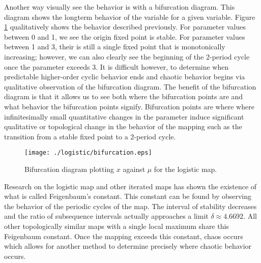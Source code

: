 Another way visually see the behavior is with a bifurcation diagram. This diagram shows the longterm behavior of the variable for a given variable. Figure \ref{log_bifurcation} qualitatively shows the behavior described previously. For parameter values between 0 and 1, we see the origin fixed point is stable. For parameter values between 1 and 3, their is still a single fixed point that is monotonically increasing; however, we can also clearly see the beginning of the 2-period cycle once the parameter exceeds 3. It is difficult however, to determine when predictable higher-order cyclic behavior ends and chaotic behavior begins via qualitative observation of the bifurcation diagram. The benefit of the bifurcation diagram is that it allows us to see both where the bifurcation points are and what behavior the bifurcation points signify. Bifurcation points are 
where where infinitesimally small quantitative changes in the parameter induce significant qualitative or topological change in the behavior of the mapping such as the transition from a stable fixed point to a 2-period cycle. 
\begin{figure}
    \centering
    \texttt{[image: ./logistic/bifurcation.eps]}
    \caption{Bifurcation diagram plotting $x$ against $\mu$ for the logistic map.}
    \label{log_bifurcation}
\end{figure}

Research on the logistic map and other iterated maps has shown the existence of what is called Feigenbaum's constant. This constant can be found by observing the behavior of the periodic cycles of the map. The interval of stability decreases and the ratio of subsequence intervals actually approaches a limit $\delta\approx4.6692$\autocite{Puu2003}. All other topologically similar maps with a single local maximum share this Feigenbaum constant. Once the mapping exceeds this constant, chaos occurs which allows for another method to determine precisely where chaotic behavior occurs. 

